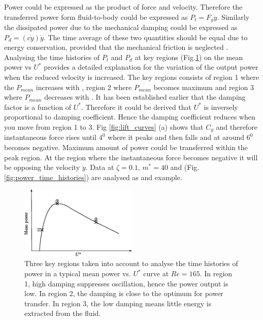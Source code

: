 
 



 
 Power could be expressed as the product of force and velocity. Therefore the transferred power form fluid-to-body could be expressed as $P_t=F_y\dot{y}$. Similarly the dissipated power due to the mechanical damping could be expressed as $P_d=(c\dot{y})\dot{y}$. The time average of these two quantities should be equal due to energy conservation, provided that the mechanical friction is neglected . Analysing the  time histories of $P_t $ and $P_d$ at key regions (Fig.\ref{fig:regions_1}) on the mean power vs $U^*$ provides a detailed explanation for the variation of the output power when the reduced velocity is increased. The key regions consists of region 1 where the $P_{mean}$ increases with \ustar, region 2 where $P_{mean}$ becomes maximum and region 3 where $P_{mean}$ decreases with \ustar. It has been established earlier that the damping factor is a function of $U^*$. Therefore it could be derived that $U^*$ is inversely proportional to damping coefficient. Hence the damping coefficient reduces when you move from region 1 to 3. Fig \ref{fig:lift_curves} (a) shows that $C_y$ and therefore instantaneous force rises until $4^0$ where it peaks and then falls and at around $6^0$ becomes negative. Maximum amount of power could be transferred within the peak region. At the region where the instantaneous force becomes negative it will be opposing the velocity $\dot{y}$. Data at $\zeta=0.1$, $m^*=40$ and  (Fig.\ref{fig:power_time_histories}) are analysed as and example.  

\begin{figure}[h!]
\centering
\includegraphics[width=0.5\textwidth]{../FnP/sketch_1}
\caption{ Three key regions taken into account to analyse the time histories of power in a typical mean power vs. $U^*$ curve at $Re=165$. In region 1, high damping suppresses oscillation, hence the power output is low. In region 2, the damping is close to the optimum for power transfer. In region 3, the low damping means little energy is extracted from the fluid.}
\label{fig:regions_1}
\end{figure}

